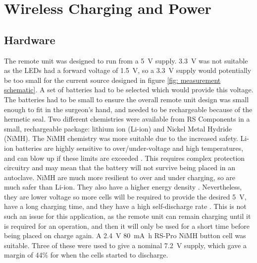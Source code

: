 \section{Wireless Charging and Power}\label{power}

\subsection{Hardware}

The remote unit was designed to run from a \SI{5}{\volt} supply. \SI{3.3}{\volt} was not suitable as the LEDs had a forward voltage of \SI{1.5}{\volt}, so a \SI{3.3}{\volt} supply would potentially be too small for the current source designed in figure \ref{fig: measurement schematic}. A set of batteries had to be selected which would provide this voltage. The batteries had to be small to ensure the overall remote unit design was small enough to fit in the surgeon's hand, and needed to be rechargeable because of the hermetic seal. Two different chemistries were available from RS Components \cite{rs} in a small, rechargeable package: lithium ion (Li-ion) and Nickel Metal Hydride (NiMH). The NiMH chemistry was more suitable due to the increased safety. Li-ion batteries are highly sensitive to over/under-voltage and high temperatures, and can blow up if these limits are exceeded \cite{batteries}. This requires complex protection circuitry and may mean that the battery will not survive being placed in an autoclave. NiMH are much more resilient to over and under charging, so are much safer than Li-ion. They also have a higher energy density \cite{batteries}. Nevertheless, they are lower voltage so more cells will be required to provide the desired \SI{5}{\volt}, have a long charging time, and they have a high self-discharge rate \cite{batteries}. This is not such an issue for this application, as the remote unit can remain charging until it is required for an operation, and then it will only be used for a short time before being placed on charge again. A \SI{2.4}{\volt} \SI{80}{\milli\ampere\hour} RS-Pro NiMH button cell \cite{rs_pro_batteries} was suitable. Three of these were used to give a nominal \SI{7.2}{\volt} supply, which gave a margin of 44\% for when the cells started to discharge.\\

